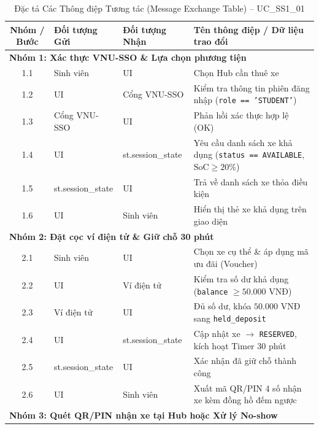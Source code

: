\documentclass[12pt,a4paper]{article}
\begin{document}
\begin{table}[H]
    \centering
    \small
    \renewcommand{\arraystretch}{1.25}
    \caption{Đặc tả Các Thông điệp Tương tác (Message Exchange Table) -- UC\_SS1\_01}
    \label{tab:msg-ss1-01}
    \begin{tabularx}{\textwidth}{|c|>{\raggedright\arraybackslash}p{2.6cm}|>{\raggedright\arraybackslash}p{2.6cm}|>{\raggedright\arraybackslash}X|}
        \hline
        \textbf{Nhóm / Bước} & \textbf{Đối tượng Gửi} & \textbf{Đối tượng Nhận} & \textbf{Tên thông điệp / Dữ liệu trao đổi} \\
        \hline
        \multicolumn{4}{|l|}{\textbf{Nhóm 1: Xác thực VNU-SSO \& Lựa chọn phương tiện}} \\
        \hline
        1.1 & Sinh viên & UI & Chọn Hub cần thuê xe \\
        1.2 & UI & Cổng VNU-SSO & Kiểm tra thông tin phiên đăng nhập (\texttt{role == 'STUDENT'}) \\
        1.3 & Cổng VNU-SSO & UI & Phản hồi xác thực hợp lệ (OK) \\
        1.4 & UI & st.session\_state & Yêu cầu danh sách xe khả dụng (\texttt{status == AVAILABLE}, $\text{SoC} \ge 20\%$) \\
        1.5 & st.session\_state & UI & Trả về danh sách xe thỏa điều kiện \\
        1.6 & UI & Sinh viên & Hiển thị thẻ xe khả dụng trên giao diện \\
        \hline
        \multicolumn{4}{|l|}{\textbf{Nhóm 2: Đặt cọc ví điện tử \& Giữ chỗ 30 phút}} \\
        \hline
        2.1 & Sinh viên & UI & Chọn xe cụ thể \& áp dụng mã ưu đãi (Voucher) \\
        2.2 & UI & Ví điện tử & Kiểm tra số dư khả dụng (\texttt{balance} $\ge 50.000\text{ VNĐ}$) \\
        2.3 & Ví điện tử & UI & Đủ số dư, khóa $50.000\text{ VNĐ}$ sang \texttt{held\_deposit} \\
        2.4 & UI & st.session\_state & Cập nhật xe $\rightarrow$ \texttt{RESERVED}, kích hoạt Timer 30 phút \\
        2.5 & st.session\_state & UI & Xác nhận đã giữ chỗ thành công \\
        2.6 & UI & Sinh viên & Xuất mã QR/PIN 4 số nhận xe kèm đồng hồ đếm ngược \\
        \hline
        \multicolumn{4}{|l|}{\textbf{Nhóm 3: Quét QR/PIN nhận xe tại Hub hoặc Xử lý No-show}} \\

\end{tabularx}
\end{table}
\end{document}
